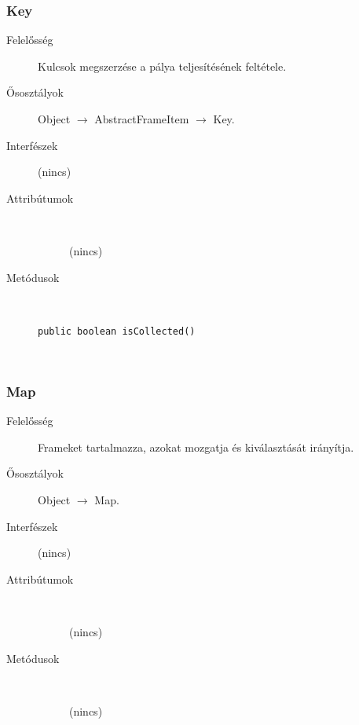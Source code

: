 		\subsubsection{Key}
		\begin{description}
		\item[Felelősség]
		Kulcsok megszerzése a pálya teljesítésének feltétele.
		\item[Ősosztályok] Object $\rightarrow{}$ AbstractFrameItem $\rightarrow{}$ Key.
		\item[Interfészek] (nincs)
		\item[Attribútumok]$\ $
		\begin{description}
		\item[] (nincs)
		\end{description}
		\item[Metódusok]$\ $
		\begin{description}
			\item[\texttt{public boolean isCollected()}] \hfill \\
		\end{description}
		\end{description}
		
		\subsubsection{Map}
		\begin{description}
		\item[Felelősség]
		Frameket tartalmazza, azokat mozgatja és kiválasztását irányítja.
		\item[Ősosztályok] Object $\rightarrow{}$ Map.
		\item[Interfészek] (nincs)
		\item[Attribútumok]$\ $
		\begin{description}
		\item[] (nincs)
		\end{description}
		\item[Metódusok]$\ $
		\begin{description}
		\item[] (nincs)
		\end{description}
		\end{description}
		
